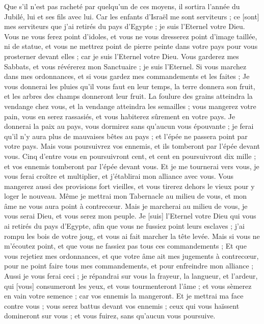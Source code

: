 \begin{multicols}{2}
Que s'il n'est pas racheté par quelqu'un de ces moyens, il sortira l'année du Jubilé, lui et ses fils avec lui.
Car les enfants d'Israël me sont serviteurs ; ce [sont] mes serviteurs que j'ai retirés du pays d'Egypte ; je suis l'Eternel votre Dieu.
\VerseOne{}Vous ne vous ferez point d'idoles, et vous ne vous dresserez point d'image taillée, ni de statue, et vous ne mettrez point de pierre peinte dans votre pays pour vous prosterner devant elles ; car je suis l'Eternel votre Dieu.
Vous garderez mes Sabbats, et vous révérerez mon Sanctuaire ; je suis l'Eternel.
Si vous marchez dans mes ordonnances, et si vous gardez mes commandements et les faites ;
Je vous donnerai les pluies qu'il vous faut en leur temps, la terre donnera son fruit, et les arbres des champs donneront leur fruit.
La foulure des grains atteindra la vendange chez vous, et la vendange atteindra les semailles ; vous mangerez votre pain, vous en serez rassasiés, et vous habiterez sûrement en votre pays.
Je donnerai la paix au pays, vous dormirez sans qu'aucun vous épouvante ; je ferai qu'il n'y aura plus de mauvaises bêtes au pays ; et l'épée ne passera point par votre pays.
Mais vous poursuivrez vos ennemis, et ils tomberont par l'épée devant vous.
Cinq d'entre vous en poursuivront cent, et cent en poursuivront dix mille ; et vos ennemis tomberont par l'épée devant vous.
Et je me tournerai vers vous, je vous ferai croître et multiplier, et j'établirai mon alliance avec vous.
Vous mangerez aussi des provisions fort vieilles, et vous tirerez dehors le vieux pour y loger le nouveau.
Même je mettrai mon Tabernacle au milieu de vous, et mon âme ne vous aura point à contrecœur.
Mais je marcherai au milieu de vous, je vous serai Dieu, et vous serez mon peuple.
Je [suis] l'Eternel votre Dieu qui vous ai retirés du pays d'Egypte, afin que vous ne fussiez point leurs esclaves ; j'ai rompu les bois de votre joug, et vous ai fait marcher la tête levée.
Mais si vous ne m'écoutez point, et que vous ne fassiez pas tous ces commandements ;
Et que vous rejetiez mes ordonnances, et que votre âme ait mes jugements à contrecœur, pour ne point faire tous mes commandements, et pour enfreindre mon alliance ;
Aussi je vous ferai ceci ; je répandrai sur vous la frayeur, la langueur, et l'ardeur, qui [vous] consumeront les yeux, et vous tourmenteront l'âme ; et vous sèmerez en vain votre semence ; car vos ennemis la mangeront.
Et je mettrai ma face contre vous ; vous serez battus devant vos ennemis ; ceux qui vous haïssent domineront sur vous ; et vous fuirez, sans qu'aucun vous poursuive.

\end{multicols}
